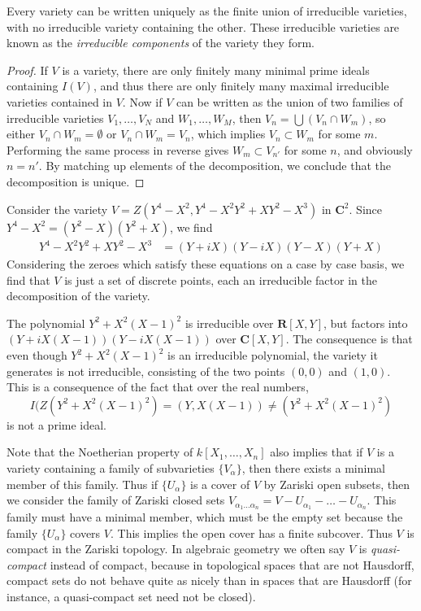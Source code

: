 \begin{theorem}
    Every variety can be written uniquely as the finite union of irreducible varieties, with no irreducible variety containing the other. These irreducible varieties are known as the \emph{irreducible components} of the variety they form.
\end{theorem}
\begin{proof}
    If $V$ is a variety, there are only finitely many minimal prime ideals containing $I(V)$, and thus there are only finitely many maximal irreducible varieties contained in $V$. Now if $V$ can be written as the union of two families of irreducible varieties $V_1, \dots, V_N$ and $W_1, \dots, W_M$, then $V_n = \bigcup (V_n \cap W_m)$, so either $V_n \cap W_m = \emptyset$ or $V_n \cap W_m = V_n$, which implies $V_n \subset W_m$ for some $m$. Performing the same process in reverse gives $W_m \subset V_{n'}$ for some $n$, and obviously $n = n'$. By matching up elements of the decomposition, we conclude that the decomposition is unique.
\end{proof}

\begin{example}
    Consider the variety $V = Z(Y^4 - X^2, Y^4 - X^2Y^2 + XY^2 - X^3)$ in $\mathbf{C}^2$. Since $Y^4 - X^2 = (Y^2 - X)(Y^2 + X)$, we find
    \begin{align*}
        Y^4 - X^2Y^2 + XY^2 - X^3 &= (Y + iX)(Y - iX)(Y-X)(Y+X)
    \end{align*}
    Considering the zeroes which satisfy these equations on a case by case basis, we find that $V$ is just a set of discrete points, each an irreducible factor in the decomposition of the variety.
\end{example}

\begin{example}
    The polynomial $Y^2 + X^2(X-1)^2$ is irreducible over $\mathbf{R}[X,Y]$, but factors into $(Y + iX(X-1))(Y - iX(X-1))$ over $\mathbf{C}[X,Y]$. The consequence is that even though $Y^2 + X^2(X-1)^2$ is an irreducible polynomial, the variety it generates is not irreducible, consisting of the two points $(0,0)$ and $(1,0)$. This is a consequence of the fact that over the real numbers,
    \[ I(Z(Y^2 + X^2(X-1)^2) = (Y,X(X-1)) \neq (Y^2 + X^2(X - 1)^2) \]
    is not a prime ideal.
\end{example}

Note that the Noetherian property of $k[X_1,\dots,X_n]$ also implies that if $V$ is a variety containing a family of subvarieties $\{ V_\alpha \}$, then there exists a minimal member of this family. Thus if $\{ U_\alpha \}$ is a cover of $V$ by Zariski open subsets, then we consider the family of Zariski closed sets $V_{\alpha_1\dots \alpha_n} = V - U_{\alpha_1} - \dots - U_{\alpha_n}$. This family must have a minimal member, which must be the empty set because the family $\{ U_\alpha \}$ covers $V$. This implies the open cover has a finite subcover. Thus $V$ is compact in the Zariski topology. In algebraic geometry we often say $V$ is \emph{quasi-compact} instead of compact, because in topological spaces that are not Hausdorff, compact sets do not behave quite as nicely than in spaces that are Hausdorff (for instance, a quasi-compact set need not be closed).

